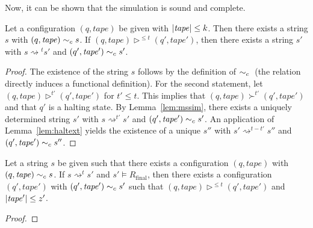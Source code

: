 \documentclass[a4paper,UKenglish,cleveref, autoref]{lipics-v2019}
\newcommand{\TODO}[1]{\ifthenelse{\isundefined{\showTODOs}}{}{\colorbox{red}{\LARGE TODO}:#1}}
\newcommand{\strent}{\rightsquigarrow}
\newcommand{\Rfinal}{R_{\text{final}}}
\begin{document}
Now, it can be shown that the simulation is sound and complete.

\begin{theorem}[Completeness]\label{thm:simcomplete}
  Let a configuration $(q, \mathit{tape})$ be given with $|\mathit{tape}| \le k$. Then there exists a string $s$ with $(q, \mathit{tape}) \sim_c{} s$. If $(q, \mathit{tape}) \rhd^{\le t} (q', \mathit{tape}')$, then there exists a string $s'$ with $s \strent{}^t s'$ and $(q', \mathit{tape}') \sim_c{} s'$.  
\end{theorem}
\begin{proof}
  The existence of the string $s$ follows by the definition of $\sim_c{}$ (the relation directly induces a functional definition).  
  For the second statement, let $(q, \mathit{tape}) \rhd^{t'} (q', \mathit{tape}')$ for $t' \le t$. 
  This implies that $(q, \mathit{tape}) \succ^{t'} (q', \mathit{tape}')$ and that $q'$ is a halting state. 
  By Lemma~\ref{lem:mssim}, there exists a uniquely determined string $s'$ with $s \strent^{t'} s'$ and $(q', \mathit{tape}') \sim_c{} s'$. An application of Lemma~\ref{lem:haltext} yields the existence of a unique $s''$ with $s' \strent^{t - t'} s''$ and $(q', \mathit{tape}') \sim_c{} s''$.
\end{proof}

\begin{theorem}[Soundness]\label{thm:simsound}
  Let a string $s$ be given such that there exists a configuration $(q, \mathit{tape})$ with $(q, \mathit{tape}) \sim_c{} s$. If $s \strent^t s'$ and $s' \models \Rfinal$, then there exists a configuration $(q', \mathit{tape}')$ with $(q', \mathit{tape}') \sim_c{} s'$ such that $(q, \mathit{tape}) \rhd^{\le t} (q', \mathit{tape}')$ and $|\mathit{tape}'| \le z'$. 
\end{theorem}
\begin{proof}
  \TODO{}  
\end{proof}
\end{document}
